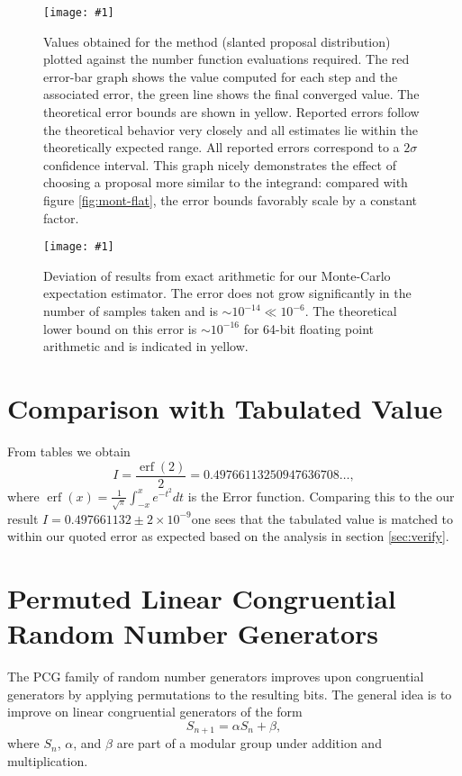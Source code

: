 \documentclass[10pt, a4paper]{article}
\newcommand{\plot}[3]{\begin{figure}[htp]\centering\texttt{[image: \#1]}\caption{#2}\label{#3}\end{figure}}
\newcommand{\finalval}{0.497661132 \pm 2\times10^{-9}}
\newcommand{\final}{$I = \finalval$}
\begin{document}
  \plot{proj-mont-slanted-accuracy}{
    Values obtained for the \is{} method (slanted proposal distribution) plotted against the number
    function evaluations required. The red
    error-bar graph shows the value computed for each step and the associated error, the green line
    shows the final converged value. The theoretical error bounds are shown in yellow. Reported errors
    follow the theoretical behavior very closely and all estimates lie within the theoretically expected range.
    All reported errors correspond to a $2\sigma$ confidence interval. This graph nicely demonstrates the
    effect of choosing a proposal more similar to the integrand: compared with figure \ref{fig:mont-flat},
    the error bounds favorably scale by a constant factor.
  }{fig:mont-slant}

  \plot{proj-mont-stab}{
    Deviation of results from exact arithmetic for our Monte-Carlo expectation estimator. The error
    does not grow significantly in the
    number of samples taken and is $\sim 10^{-14} \ll 10^{-6}$. The theoretical lower bound on this
    error is $\sim 10^{-16}$ for 64-bit floating point arithmetic and is indicated in yellow.
  }{fig:float-error}

\pagebreak
{}


\appendix{}

\section{Comparison with Tabulated Value}
\label{app:cheat}
From tables we obtain
\begin{equation}
I = \frac{\operatorname{erf}(2)}{2} = 0.49766113250947636708 \dots,
\end{equation}
where $\operatorname{erf}(x) = \frac{1}{\sqrt\pi}\int_{-x}^x e^{-t^2} dt$ is the Error function. Comparing
this to the our result \final one sees that the tabulated value is matched to within our
quoted error as expected based on the analysis in section \ref{sec:verify}.

\section{Permuted Linear Congruential Random Number Generators}
\label{app:pcg}

The PCG family of random number generators improves upon congruential generators by applying
permutations to the resulting bits\cite{pcg}. The general idea is to improve on linear congruential
generators of the form
\begin{equation}
S_{n+1} = \alpha S_n + \beta,
\end{equation}
where $S_n$, $\alpha$, and $\beta$ are part of a modular group under addition and multiplication.
\end{document}
